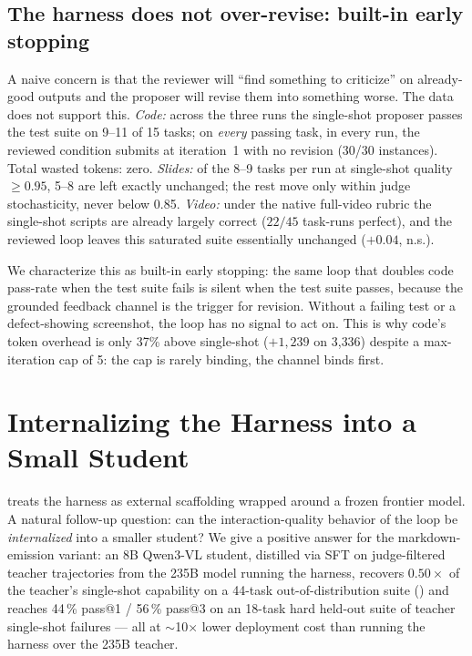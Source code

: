 \documentclass[11pt]{article}
\begin{document}
\subsection{The harness does not over-revise: built-in early stopping}
\label{sec:harness-earlystop}

A naive concern is that the reviewer will ``find something to criticize'' on already-good outputs and the proposer will revise them into something worse. The data does not support this.
\emph{Code:} across the three runs the single-shot proposer passes the test suite on 9--11 of 15 tasks; on \emph{every} passing task, in every run, the reviewed condition submits at iteration~1 with no revision (30/30 instances). Total wasted tokens: zero.
\emph{Slides:} of the 8--9 tasks per run at single-shot quality $\geq 0.95$, 5--8 are left exactly unchanged; the rest move only within judge stochasticity, never below 0.85.
\emph{Video:} under the native full-video rubric the single-shot scripts are already largely correct ($22/45$ task-runs perfect), and the reviewed loop leaves this saturated suite essentially unchanged ($+0.04$, n.s.).

We characterize this as built-in early stopping: the same loop that doubles code pass-rate when the test suite fails is silent when the test suite passes, because the grounded feedback channel is the trigger for revision. Without a failing test or a defect-showing screenshot, the loop has no signal to act on. This is why code's token overhead is only 37\% above single-shot ($+1{,}239$ on 3{,}336) despite a max-iteration cap of 5: the cap is rarely binding, the channel binds first.



\section{Internalizing the Harness into a Small Student}
\label{sec:distill}

 treats the harness as external scaffolding wrapped around a frozen frontier model. A natural follow-up question: can the interaction-quality behavior of the loop be \emph{internalized} into a smaller student? We give a positive answer for the markdown-emission variant: an 8B Qwen3-VL student, distilled via SFT on judge-filtered teacher trajectories from the 235B model running the harness, recovers $0.50\times$ of the teacher's single-shot capability on a 44-task out-of-distribution suite () and reaches 44\,\% pass@1 / 56\,\% pass@3 on an 18-task hard held-out suite of teacher single-shot failures --- all at $\sim$10$\times$ lower deployment cost than running the harness over the 235B teacher.
\end{document}
